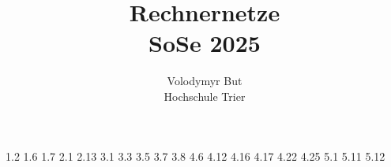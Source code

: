 \documentclass[10pt, oneside]{article}
\title{Rechnernetze\\[10pt]\Large{SoSe 2025}}
\author{Volodymyr But\\[10pt]Hochschule Trier}
\date{}
\begin{document}
\maketitle
\vspace{25px}

{1.2}
{1.6}
{1.7}
{2.1}
{2.13}
{3.1}
\pagebreak
{3.3}
{3.5}
\pagebreak
{3.7}
{3.8}
{4.6}
{4.12}
{4.16}
{4.17}
{4.22}
{4.25}
\setcounter{figure}{0}
{5.1}
{5.11}
{5.12}
\end{document}
